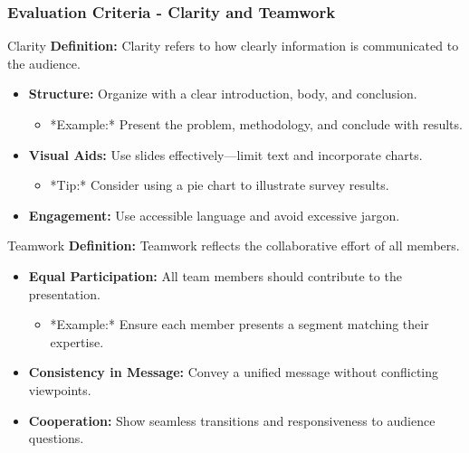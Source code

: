 \documentclass[aspectratio=169]{beamer}
\begin{document}
\begin{frame}[fragile]
  \frametitle{Evaluation Criteria - Clarity and Teamwork}
  \begin{block}{Clarity}
    \textbf{Definition:} Clarity refers to how clearly information is communicated to the audience.
  
    \begin{itemize}
      \item \textbf{Structure:} Organize with a clear introduction, body, and conclusion.
            \begin{itemize}
              \item *Example:* Present the problem, methodology, and conclude with results.
            \end{itemize}
      \item \textbf{Visual Aids:} Use slides effectively—limit text and incorporate charts.
            \begin{itemize}
              \item *Tip:* Consider using a pie chart to illustrate survey results.
            \end{itemize}
      \item \textbf{Engagement:} Use accessible language and avoid excessive jargon.
    \end{itemize}
  \end{block}

  \begin{block}{Teamwork}
    \textbf{Definition:} Teamwork reflects the collaborative effort of all members.
  
    \begin{itemize}
      \item \textbf{Equal Participation:} All team members should contribute to the presentation.
            \begin{itemize}
              \item *Example:* Ensure each member presents a segment matching their expertise.
            \end{itemize}
      \item \textbf{Consistency in Message:} Convey a unified message without conflicting viewpoints.
      \item \textbf{Cooperation:} Show seamless transitions and responsiveness to audience questions.
    \end{itemize}
  \end{block}
\end{frame}
\end{document}
